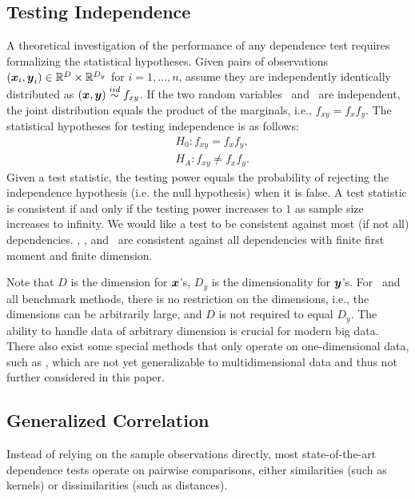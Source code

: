 \documentclass[11pt]{extarticle}
\begin{document}
\subsection{Testing Independence}

A theoretical investigation of the performance of any dependence test requires formalizing the statistical hypotheses.
 Given pairs of observations $(\boldsymbol{x}_{i},\boldsymbol{y}_{i}) \in \mathbb{R}^{D} \times \mathbb{R}^{D_y}$ for $i=1,\ldots,n$, assume they are independently identically distributed as $(\boldsymbol{x},\boldsymbol{y}) \overset{iid}{\sim} f_{xy}$. If the two random variables \mbx~and \mby~are independent, the joint distribution equals the product of the marginals, i.e., $f_{xy}=f_x f_y$.  The statistical hypotheses for testing independence is as follows:
\begin{align*}
& H_{0}: f_{xy}=f_{x}f_{y},\\
& H_{A}: f_{xy} \neq f_{x}f_{y}.
\end{align*}
Given a test statistic, the testing power equals the probability of rejecting the independence hypothesis (i.e. the null hypothesis) when it is false. A test statistic is consistent if and only if the testing power increases to $1$ as sample size increases to infinity. We would like a test to be consistent against most (if not all) dependencies. \Dcorr, \Mcorr, and \Hhg~are consistent against all dependencies with finite first moment and finite dimension.

Note that $D$ is the dimension for $\boldsymbol{x}$'s, $D_y$ is the dimensionality for $\boldsymbol{y}$'s. For \Mgc~and all benchmark methods, there is no restriction on the dimensions, i.e., the dimensions can be arbitrarily large, and $D$ is not required to equal $D_y$. The ability to handle data of arbitrary dimension is crucial for modern big data. There also exist some special methods that only operate on one-dimensional data, such as \cite{Reshef2011,heller2016consistent,Huo2016}, which are not yet generalizable to multidimensional data and thus not further considered in this paper.

\subsection{Generalized Correlation}
Instead of relying on the sample observations directly, most state-of-the-art dependence tests operate on pairwise comparisons, either similarities (such as kernels) or dissimilarities (such as distances).
\end{document}
